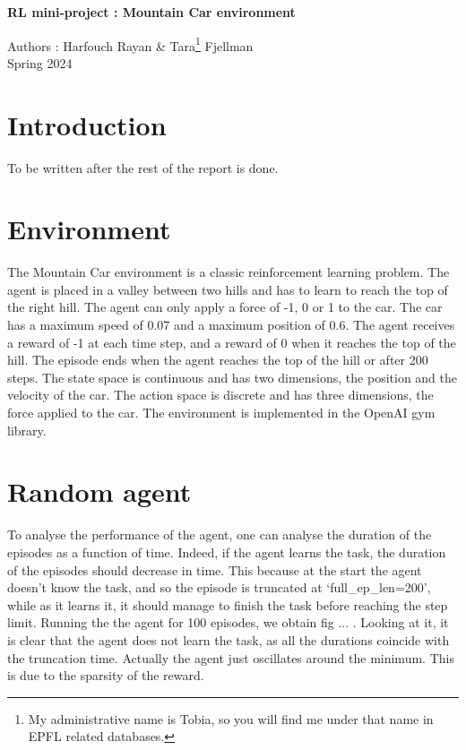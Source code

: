 \documentclass[a4paper, 12pt,oneside]{article}
\begin{document}
 
	\begin{center}
	    \Large
	    \textbf{RL mini-project : Mountain Car environment}
	        
	    \vspace{0.4cm}
	    \large
	    Authors : Harfouch Rayan \& Tara\footnote[1]{My administrative name is Tobia, so you will find me under that name in EPFL related databases.} Fjellman \\
	    \small{Spring 2024}
	\end{center}

    \section{Introduction}
        To be written after the rest of the report is done.

    \section{Environment}
        The Mountain Car environment is a classic reinforcement learning problem. The agent is placed in a valley between two hills and has to learn to reach the top of the right hill. The agent can only apply a force of -1, 0 or 1 to the car. The car has a maximum speed of 0.07 and a maximum position of 0.6. The agent receives a reward of -1 at each time step, and a reward of 0 when it reaches the top of the hill. The episode ends when the agent reaches the top of the hill or after 200 steps. The state space is continuous and has two dimensions, the position and the velocity of the car. The action space is discrete and has three dimensions, the force applied to the car. The environment is implemented in the OpenAI gym library.
    \section{Random agent}
    To analyse the performance of the agent, one can analyse the duration of the episodes as a function of time. Indeed, if the agent learns the task, the duration of the episodes should decrease in time. This because at the start the agent doesn't know the task, and so the episode is truncated at `full\_ep\_len=200', while as it learns it, it should manage to finish the task before reaching the step limit. 
    Running the the agent for 100 episodes, we obtain fig ... . Looking at it, it is clear that the agent does not learn the task, as all the durations coincide with the truncation time. Actually the agent just oscillates around the minimum. This is due to the sparsity of the reward. 
\end{document}
